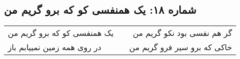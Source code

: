 \begin{center}
\section*{شماره ۱۸: یک همنفسی کو که برو گریم من}
\label{sec:018}
\begin{longtable}{l p{0.5cm} r}
یک همنفسی کو که برو گریم من
&&
گر هم نفسی بود نکو گریم من
\\
در روی همه زمین نمییابم باز
&&
خاکی که برو سیر فرو گریم من
\\
\end{longtable}
\end{center}
